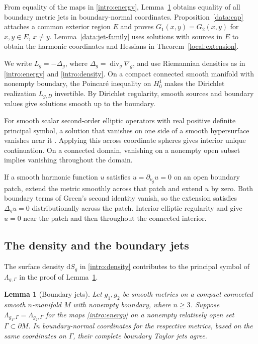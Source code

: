 \documentclass[11pt,a4paper]{article}
\newtheorem{lemma}[theorem]{Lemma}
\theoremstyle{definition}
\theoremstyle{remark}
\newcommand{\dd}{\mathrm d}
\numberwithin{equation}{section}
\begin{document}
From equality of the maps in \eqref{intro:energy}, Lemma~\ref{data:jets}
obtains equality of all boundary metric jets in boundary-normal
coordinates. Proposition~\ref{data:cap} attaches a common exterior
region $E$ and proves $G_1(x,y)=G_2(x,y)$ for $x,y\in E$, $x\ne y$.
Lemma~\ref{data:jet-family} uses solutions with sources in $E$ to
obtain the harmonic coordinates and Hessians in Theorem~\ref{local:extension}.

We write $L_g=-\Delta_g$, where $\Delta_g=\operatorname{div}_g\nabla_g$,
and use Riemannian densities as in \eqref{intro:energy}
and \eqref{intro:density}. On a compact connected smooth manifold with
nonempty boundary, the Poincar\'e inequality on $H^1_0$ makes the
Dirichlet realization $L_{g,D}$ invertible. By Dirichlet regularity,
smooth sources and boundary values give solutions smooth up to the
boundary.

For smooth scalar second-order elliptic operators with real positive
definite principal symbol, a solution that vanishes on one side of a
smooth hypersurface vanishes near it
\citep[Definition~8.2(a) and Theorem~8]{KochTataru2005}.
Applying this across coordinate spheres gives interior unique
continuation. On a connected domain, vanishing on a nonempty open
subset implies vanishing throughout the domain.

If a smooth harmonic function $u$ satisfies $u=\partial_{\nu_g}u=0$
on an open boundary patch, extend the metric smoothly across that
patch and extend $u$ by zero. Both boundary terms of Green's second
identity vanish, so the extension satisfies $\Delta_g u=0$
distributionally across the patch. Interior elliptic regularity
and \citep[Theorem~8]{KochTataru2005} give $u=0$ near the patch and
then throughout the connected interior.

\subsection{The density and the boundary jets}

The surface density $\dd S_g$ in \eqref{intro:density} contributes
to the principal symbol of $\Lambda_{g,\Gamma}$ in the proof of
Lemma~\ref{data:jets}.

\begin{lemma}[Boundary jets]\label{data:jets}
Let $g_1,g_2$ be smooth metrics on a compact connected smooth
$n$-manifold $M$ with nonempty boundary, where $n\ge3$. Suppose
$\Lambda_{g_1,\Gamma}=\Lambda_{g_2,\Gamma}$ for the maps
\eqref{intro:energy} on a nonempty relatively open set
$\Gamma\subset\partial M$. In boundary-normal coordinates for the
respective metrics, based on the same coordinates on $\Gamma$,
their complete boundary Taylor jets agree.
\end{lemma}
\end{document}
